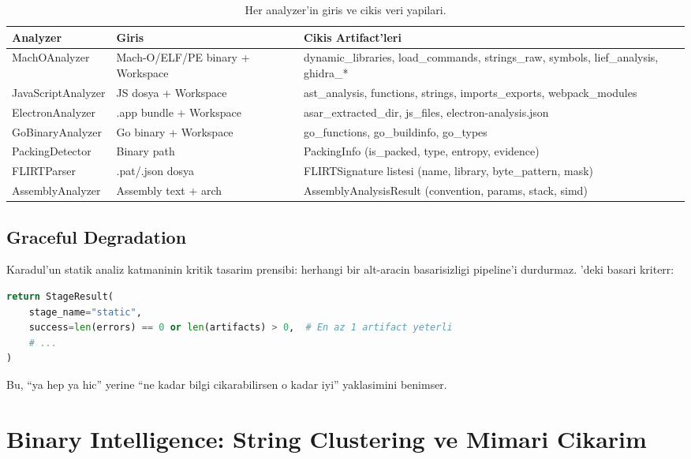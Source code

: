 \begin{table}[htbp]
\centering
\begin{tabular}{lp{4cm}p{6cm}}
\toprule
\textbf{\color{sectioncyan}Analyzer} & \textbf{\color{sectioncyan}Giris} & \textbf{\color{sectioncyan}Cikis Artifact'leri} \\
\midrule
MachOAnalyzer & Mach-O/ELF/PE binary + Workspace & dynamic\_libraries, load\_commands, strings\_raw, symbols, lief\_analysis, ghidra\_* \\
JavaScriptAnalyzer & JS dosya + Workspace & ast\_analysis, functions, strings, imports\_exports, webpack\_modules \\
ElectronAnalyzer & .app bundle + Workspace & asar\_extracted\_dir, js\_files, electron-analysis.json \\
GoBinaryAnalyzer & Go binary + Workspace & go\_functions, go\_buildinfo, go\_types \\
PackingDetector & Binary path & PackingInfo (is\_packed, type, entropy, evidence) \\
FLIRTParser & .pat/.json dosya & FLIRTSignature listesi (name, library, byte\_pattern, mask) \\
AssemblyAnalyzer & Assembly text + arch & AssemblyAnalysisResult (convention, params, stack, simd) \\
\bottomrule
\end{tabular}
\caption{Her analyzer'in giris ve cikis veri yapilari.}
\label{tab:analyzer-io}
\end{table}

\subsection{Graceful Degradation}

Karadul'un statik analiz katmaninin kritik tasarim prensibi: herhangi bir alt-aracin basarisizligi pipeline'i durdurmaz. 'deki basari kriterr:

\begin{lstlisting}[language=Python, caption={Kismi basari kriteri}]
return StageResult(
    stage_name="static",
    success=len(errors) == 0 or len(artifacts) > 0,  # En az 1 artifact yeterli
    # ...
)
\end{lstlisting}

Bu, ``ya hep ya hic'' yerine ``ne kadar bilgi cikarabilirsen o kadar iyi'' yaklasimini benimser.


\section{Binary Intelligence: String Clustering ve Mimari Cikarim}
\label{sec:binary-intelligence}


